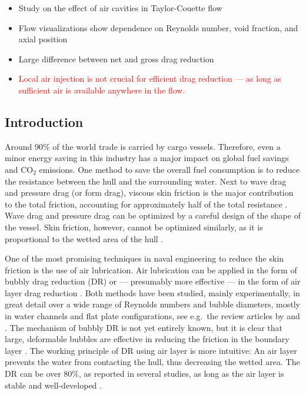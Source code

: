 \documentclass[aps,onecolumn,10pt, floatfix, superscriptaddress,longbibliography, pra]{revtex4-1}
\newcommand{\red}[1]{\textcolor{red}{#1}}
\begin{document}
{\let\clearpage\relax\maketitle}

\clearpage
{}
\begin{itemize}
\item Study on the effect of air cavities in Taylor-Couette flow
\item Flow visualizations show dependence on Reynolds number, void fraction, and axial position
\item Large difference between net and gross drag reduction
\item \red{Local air injection is not crucial for efficient drag reduction --- as long as sufficient air is available anywhere in the flow.}
\end{itemize}



\subsection{Introduction}
Around 90\% of the world trade is carried by cargo vessels. Therefore, even a minor energy saving in this industry has a major impact on global fuel savings and CO$_2$ emissions. One method to save the overall fuel consumption is to reduce the resistance between the hull and the surrounding water. Next to wave drag and pressure drag (or form drag), viscous skin friction is the major contribution to the total friction, accounting for approximately half of the total resistance \citep{larsson2010}. Wave drag and pressure drag can be optimized by a careful design of the shape of the vessel. Skin friction, however, cannot be optimized similarly, as it is proportional to the wetted area of the hull \citep{Foeth2008}.

One of the most promising techniques in naval engineering to reduce the skin friction is the use of air lubrication. Air lubrication can be applied in the form of bubbly drag reduction (DR) or --- presumably more effective --- in the form of air layer drag reduction \citep{cec10}. Both methods have been studied, mainly experimentally, in great detail over a wide range of Reynolds numbers and bubble diameters, mostly in water channels and flat plate configurations, see e.g.\ the review articles by \citet{cec10} and \citet{murai2014}. The mechanism of bubbly DR is not yet entirely known, but it is clear that large, deformable bubbles are effective in reducing the friction in the boundary layer \citep{gil13, ver16,lu05}. The working principle of DR using air layer is more intuitive: An air layer prevents the water from contacting the hull, thus decreasing the wetted area.  The DR can be over $80\%$, as reported in several studies, as long as the air layer is stable and well-developed \citep{san06, elbing2008, elbing2013, Lay2010}. 
\end{document}
